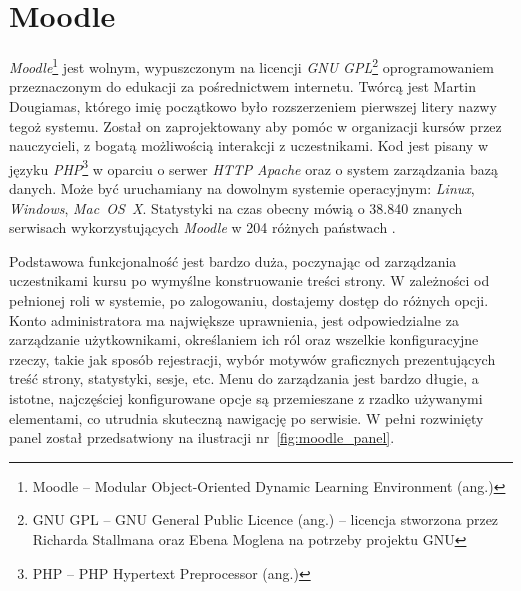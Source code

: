 \documentclass[12pt,twoside]{report}
\begin{document}
\section{Moodle}
\emph{Moodle}\footnote{Moodle -- Modular Object-Oriented Dynamic Learning Environment (ang.)}
jest wolnym, wypuszczonym na licencji \emph{GNU GPL}\footnote{GNU GPL -- GNU General Public
Licence (ang.) -- licencja stworzona przez Richarda Stallmana oraz Ebena Moglena na potrzeby
projektu GNU} oprogramowaniem przeznaczonym do edukacji za pośrednictwem internetu. Twórcą
jest Martin Dougiamas, którego imię początkowo było rozszerzeniem pierwszej litery nazwy
tegoż systemu. Został on zaprojektowany aby pomóc w organizacji kursów przez nauczycieli,
z bogatą możliwością interakcji z uczestnikami. Kod jest pisany w języku
\emph{PHP}\footnote{PHP -- PHP Hypertext Preprocessor (ang.)} w oparciu o serwer \emph{HTTP}
\emph{Apache} oraz o system zarządzania bazą danych. Może być uruchamiany na dowolnym
systemie operacyjnym: \emph{Linux}, \emph{Windows}, \emph{Mac~OS~X}. Statystyki na czas
obecny mówią o 38.840 znanych serwisach wykorzystujących \emph{Moodle} w 204 różnych
państwach \cite{moodle-statistics}.


Podstawowa funkcjonalność jest bardzo duża, poczynając od zarządzania uczestnikami kursu
po wymyślne konstruowanie treści strony. W zależności od pełnionej roli w systemie, po
zalogowaniu, dostajemy dostęp do różnych opcji. Konto administratora ma największe
uprawnienia, jest odpowiedzialne za zarządzanie użytkownikami, określaniem ich ról oraz
wszelkie konfiguracyjne rzeczy, takie jak sposób rejestracji, wybór motywów graficznych
prezentujących treść strony, statystyki, sesje, etc.
Menu do zarządzania jest bardzo długie, a istotne, najczęściej konfigurowane opcje są
przemieszane z rzadko używanymi elementami, co utrudnia skuteczną nawigację po serwisie.
W pełni rozwinięty panel został przedsatwiony na ilustracji nr~\ref{fig:moodle_panel}.
\end{document}
